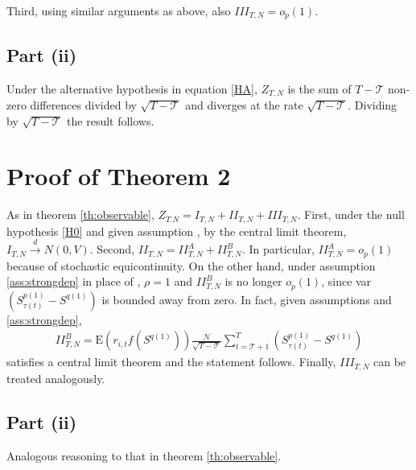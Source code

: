Third, using similar arguments as above, also $III_{T,N}=o_{p}(1)$. 

\subsection{Part (ii)}

Under the alternative hypothesis in equation \eqref{HA}, $Z_{T,N}$ is the sum of $T-\mathcal{T}$ non-zero differences divided by $\sqrt{T-\mathcal{T}}$ and diverges at the rate $\sqrt{T-\mathcal{T}}$. Dividing by $\sqrt{T-\mathcal{T}}$ the result follows.




\section{Proof of Theorem 2}
\label{Proof of th:strongdep}

As in theorem \ref{th:observable}, $Z_{T.N}=I_{T,N}+II_{T,N}+III_{T,N}$. First, under the null hypothesis \ref{H0} and given assumption , by the central limit theorem, $I_{T,N}\overset{d}{\rightarrow } N\left( 0,V\right)$. Second, $II_{T,N}=II_{T,N}^{A}+II_{T,N}^{B}$. In particular, $II_{T,N}^{A}=o_{p}(1)$ because of stochastic equicontinuity. On the other hand, under assumption \ref{ass:strongdep} in place of , $\rho =1$ and $II_{T,N}^{B}$ is no longer $o_{p}(1)$, since var $\left( S_{\tau(t)}^{p(1)}-S^{q(1)} \right) $ is bounded away from zero. In fact, given assumptions  and \ref{ass:strongdep},
\begin{align*}
II_{T,N}^{B}=\mathrm{E}\left( r_{i,t} f\left( S^{q(1)}\right) \right) \frac{\mathcal{N}}{\sqrt{T - \mathcal{T}}} \sum_{t=\mathcal{T}+1}^{T}\left( S_{\tau(t)}^{p(1)}-S^{q(1)} \right) 
\end{align*}
satisfies a central limit theorem and the statement follows. Finally, $III_{T,N}$ can be treated analogously.

\subsection{Part (ii)}

Analogous reasoning to that in theorem \ref{th:observable}.



